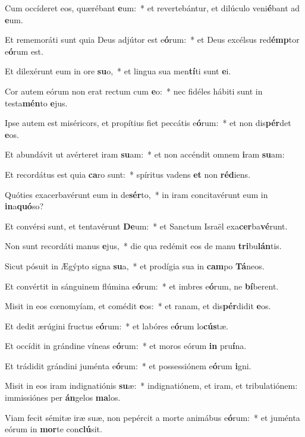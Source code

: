 \item Cum occíderet eos, quærébant \textbf{e}um:~* et revertebántur, et dilúculo veni\textbf{é}bant ad \textbf{e}um.
\item Et rememoráti sunt quia Deus adjútor est e\textbf{ó}rum:~* et Deus excélsus red\textbf{émp}tor e\textbf{ó}rum est.
\item Et dilexérunt eum in ore \textbf{su}o,~* et lingua sua men\textbf{tí}ti sunt \textbf{e}i.
\item Cor autem eórum non erat rectum cum \textbf{e}o:~* nec fidéles hábiti sunt in testa\textbf{mén}to \textbf{e}jus.
\item Ipse autem est miséricors, et propítius fiet peccátis e\textbf{ó}rum:~* et non dis\textbf{pér}det \textbf{e}os.
\item Et abundávit ut avérteret iram \textbf{su}am:~* et non accéndit omnem \textbf{i}ram \textbf{su}am:
\item Et recordátus est quia \textbf{ca}ro sunt:~* spíritus vadens \textbf{et} non \textbf{réd}iens.
\item Quóties exacerbavérunt eum in de\textbf{sér}to,~* in iram concitavérunt eum in \textbf{in}a\textbf{quó}so?
\item Et convérsi sunt, et tentavérunt \textbf{De}um:~* et Sanctum Israël exa\textbf{cer}ba\textbf{vé}runt.
\item Non sunt recordáti manus \textbf{e}jus,~* die qua redémit eos de manu \textbf{tri}bu\textbf{lán}tis.
\item Sicut pósuit in Ægýpto signa \textbf{su}a,~* et prodígia sua in \textbf{cam}po \textbf{Tá}neos.
\item Et convértit in sánguinem flúmina e\textbf{ó}rum:~* et imbres e\textbf{ó}rum, ne \textbf{bí}berent.
\item Misit in eos cœnomyíam, et comédit \textbf{e}os:~* et ranam, et dis\textbf{pér}didit \textbf{e}os.
\item Et dedit ærúgini fructus e\textbf{ó}rum:~* et labóres e\textbf{ó}rum lo\textbf{cús}tæ.
\item Et occídit in grándine víneas e\textbf{ó}rum:~* et moros eórum \textbf{in} pru\textbf{í}na.
\item Et trádidit grándini juménta e\textbf{ó}rum:~* et possessiónem e\textbf{ó}rum \textbf{i}gni.
\item Misit in eos iram indignatiónis \textbf{su}æ:~* indignatiónem, et iram, et tribulatiónem: immissiónes per \textbf{án}gelos \textbf{ma}los.
\item Viam fecit sémitæ iræ suæ, non pepércit a morte animábus e\textbf{ó}rum:~* et juménta eórum in \textbf{mor}te con\textbf{clú}sit.
